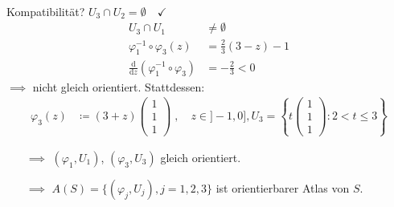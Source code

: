 \begin{example}
\begin{enum-arab}
\begin{align*}
    \end{align*}
    Kompatibilität? $U_3 \cap U_2 = \emptyset \quad \checkmark$
    \begin{align*}
      U_3 \cap U_1 &\neq \emptyset \\
      \varphi_1^{-1} \circ \varphi_3(z) &= \frac{2}{3} (3-z) - 1 \\
      \frac{\mathrm{d}}{\mathrm{d}z} \left( \varphi_1^{-1} \circ \varphi_3 \right) &= -\frac{2}{3} < 0
    \end{align*}
    $\implies$ nicht gleich orientiert. Stattdessen:
    \begin{align*}
      \varphi_3(z) &\coloneq (3+z) \begin{pmatrix} 1 \\ 1 \\ 1 \end{pmatrix} \; , \quad z \in ]-1,0] , U_3 = \left\{ t \left(\begin{smallmatrix} 1 \\ 1 \\ 1 \end{smallmatrix}\right) : 2 < t \leq 3 \right\}
    \end{align*}
    \begin{itemize}
      \item[$\implies$] $(\varphi_1,U_1)$, $(\varphi_3,U_3)$ gleich orientiert.
      
      \item[$\implies$] $A(S) = \{ (\varphi_j,U_j), j=1,2,3 \}$ ist orientierbarer Atlas von $S$.
    \end{itemize}
    

\end{enum-arab}
\end{example}
